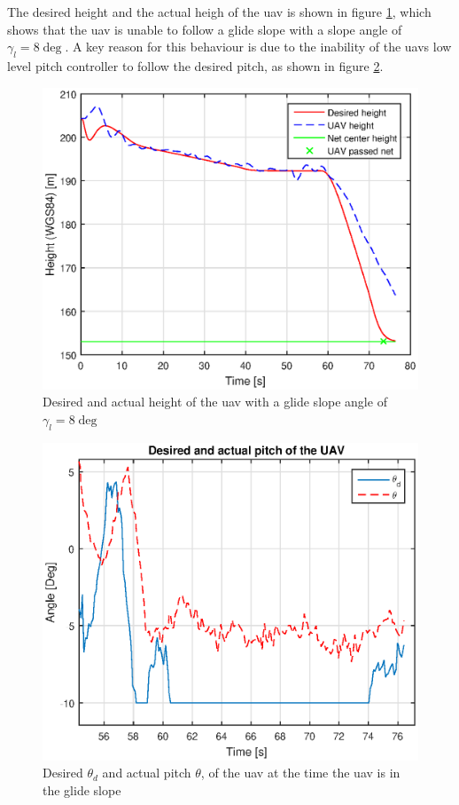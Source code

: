 The desired height and the actual heigh of the \gls{uav} is shown in figure \ref{Fig:Height1juni081328}, which shows that the \gls{uav} is unable to follow a glide slope with a slope angle of $\gamma_l = 8 \deg$. A key reason for this behaviour is due to the inability of the \gls{uav}s low level pitch controller to follow the desired pitch, as shown in figure \ref{Fig:Pitch1juni081328}. 
\begin{figure}[H]
\centering
\includegraphics[scale=0.7]{figs/Experiment/Height1juni081328.eps}
\caption{Desired and actual height of the \gls{uav} with a glide slope angle of $\gamma_l = 8 \deg$}
\label{Fig:Height1juni081328}
\end{figure}
\begin{figure}[H]
\centering
\includegraphics[scale=0.7]{figs/Experiment/Pitch1juni081328.eps}
\caption{Desired $\theta_d$ and actual pitch $\theta$, of the \gls{uav} at the time the \gls{uav} is in the glide slope}
\label{Fig:Pitch1juni081328}
\end{figure}
